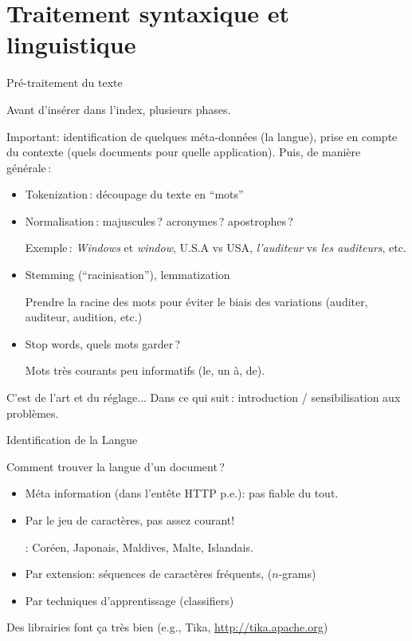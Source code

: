 \section{Traitement syntaxique et linguistique}

\begin{frame}{Pré-traitement du texte}

Avant d'insérer dans l'index, plusieurs phases.

\vfill

Important: identification de quelques méta-données (la langue), prise en compte du contexte
(quels documents pour quelle application). Puis, de manière  générale\,:

\begin{itemize}
\item \alert{Tokenization}\,: découpage du texte en ``mots''
\item \alert{Normalisation}\,: majuscules\,? acronymes\,? apostrophes\,?

     Exemple\,: \textit{Windows} et \textit{window}, U.S.A vs USA, \emph{l'auditeur}  vs \emph{les auditeurs}, etc.
     
     \item \alert{Stemming} (``racinisation''), \alert{lemmatization}
     
     Prendre la racine des mots pour éviter le biais des variations (auditer, auditeur, audition, etc.)
     
     \item  \alert{Stop words}, quels mots garder\,?
     
     Mots très courants peu informatifs (le, un à, de).
\end{itemize}

C'est de l'art et du réglage... Dans ce qui suit\,: introduction / sensibilisation aux problèmes.

\end{frame}

\begin{frame}{Identification de la Langue}

Comment trouver la langue d'un document\,?

\begin{itemize}

\item Méta information (dans l'entête HTTP p.e.): pas fiable du tout.

\item \alert{Par le jeu de caractères}, pas assez courant!


\pause

: Coréen, Japonais, Maldives, Malte, Islandais.

\item Par extension: \alert{séquences de caractères fréquents}, ($n$-grams)

\item Par techniques d'apprentissage (\alert{classifiers})

\end{itemize}

Des librairies font ça très bien (e.g., Tika, \url{http://tika.apache.org})
\end{frame}

